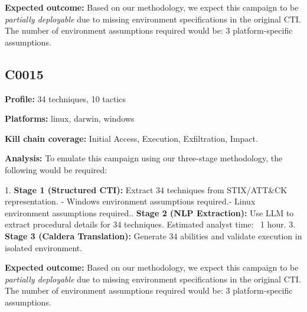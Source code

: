 \textbf{Expected outcome:} Based on our methodology, we expect this campaign
to be \textit{partially deployable} due to missing environment specifications
in the original CTI. The number of environment assumptions required would be:
3 platform-specific assumptions.



\subsection*{C0015}

\textbf{Profile:} 34 techniques, 10 tactics

\textbf{Platforms:} linux, darwin, windows

\textbf{Kill chain coverage:}
Initial Access, Execution, Exfiltration, Impact.

\textbf{Analysis:} To emulate this campaign using our three-stage methodology,
the following would be required:

1. \textbf{Stage 1 (Structured CTI):} Extract 34 techniques
   from STIX/ATT&CK representation.
   - Windows environment assumptions required.\n   - Linux environment assumptions required.. \textbf{Stage 2 (NLP Extraction):} Use LLM to extract procedural details
   for 34 techniques. Estimated analyst time: ~1 hour.
3. \textbf{Stage 3 (Caldera Translation):} Generate 34
   abilities and validate execution in isolated environment.

\textbf{Expected outcome:} Based on our methodology, we expect this campaign
to be \textit{partially deployable} due to missing environment specifications
in the original CTI. The number of environment assumptions required would be:
3 platform-specific assumptions.



